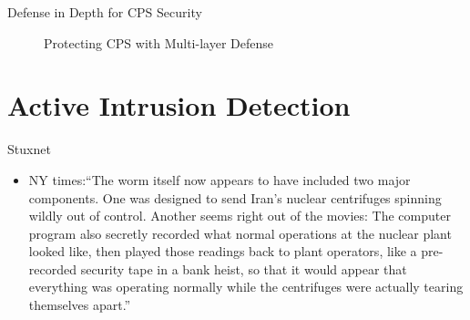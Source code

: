 \documentclass[10pt]{beamer}
\begin{document}
\begin{frame}{Defense in Depth for CPS Security}
  \begin{figure}[ht]
    \centering
  \caption{Protecting CPS with Multi-layer Defense}
  \end{figure}
\end{frame}
\section{Active Intrusion Detection}

\begin{frame}{Stuxnet}
  \begin{itemize}
    \item NY times:``The worm itself now appears to have included two major components. One was designed to send Iran's nuclear centrifuges spinning wildly out of control. Another seems right out of the movies: The computer program also \alert{secretly recorded what normal operations at the nuclear plant looked like, then played those readings back to plant operators}, like a pre-recorded security tape in a bank heist, so that it would appear that everything was operating normally while the centrifuges were actually tearing themselves apart.''
  \end{itemize}
\end{frame}
\end{document}
